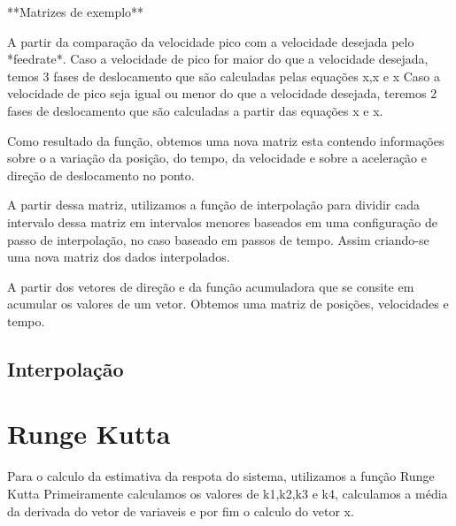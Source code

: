 **Matrizes de exemplo**

A partir da comparação da velocidade pico com a velocidade desejada pelo *feedrate*.
Caso a velocidade de pico for maior do que a velocidade desejada, temos 3 fases de deslocamento
que são calculadas pelas equações x,x e x
Caso a velocidade de pico seja igual ou menor do que a velocidade desejada, teremos 2 fases de deslocamento
que são calculadas a partir das equações x e x.

Como resultado da função, obtemos uma nova matriz esta contendo informações
sobre o a variação da posição, do tempo, da velocidade e sobre a aceleração e direção de deslocamento no ponto.

A partir dessa matriz, utilizamos a função de interpolação para dividir cada intervalo dessa matriz em intervalos menores
baseados em uma configuração de passo de interpolação, no caso baseado em passos de tempo.
Assim criando-se uma nova matriz dos dados interpolados.

A partir dos vetores de direção e da função acumuladora que se consite em acumular os valores de um vetor.
Obtemos uma matriz de posições, velocidades e tempo.

\subsection{Interpolação}

\section{Runge Kutta}



    




Para o calculo da estimativa da respota do sistema, utilizamos a função Runge Kutta
Primeiramente calculamos os valores de k1,k2,k3 e k4, calculamos a média da derivada do vetor de variaveis
e por fim o calculo do vetor x.

